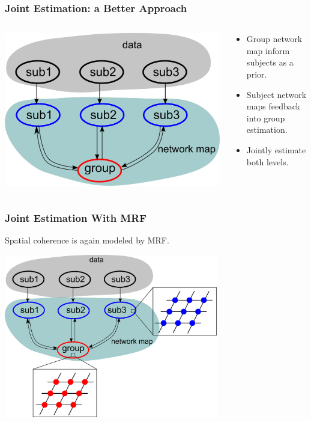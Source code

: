 \documentclass[serif]{beamer}
\begin{document}
\begin{frame}
  \frametitle{Joint Estimation: a Better Approach~\cite{Liu2012aCopy} }
  \begin{columns}
    \begin{column}{5cm}
        \includegraphics[width=\textwidth]{sfig/hier3}
    \end{column}

    \begin{column}{5cm}
      \begin{block}{}
        \begin{itemize}
          \item Group network map inform subjects as a prior.
          \item Subject network maps feedback into group estimation.
          \item Jointly estimate both levels.
        \end{itemize}
      \end{block}
    \end{column}
    
  \end{columns}
\end{frame}

\begin{frame}
  \frametitle{Joint Estimation With MRF}
  \begin{block}{}
    Spatial coherence is again modeled by MRF.
  \end{block}
  \vspace{10pt}
  \includegraphics[width=0.7\textwidth]{sfig/hier3a}
\end{frame}
\end{document}
